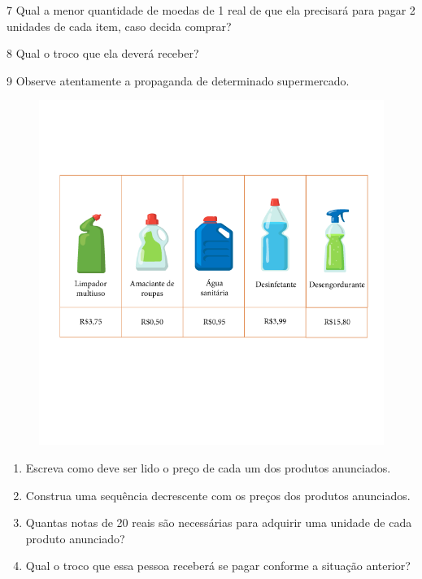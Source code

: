 \num{7} 
  Qual a menor quantidade de moedas de 1 real de que ela precisará para
  pagar 2 unidades de cada item, caso decida comprar?


\num{8} Qual o troco que ela deverá receber?



\num{9} Observe atentamente a propaganda de determinado supermercado.

\begin{figure}[htpb!]
\includegraphics[width=\textwidth]{../ilustracoes/MAT5/SAEB_5ANO_MAT_figura55.png}
\end{figure}

\begin{enumerate}
\item
  Escreva como deve ser lido o preço de cada um dos produtos anunciados.


\item
  Construa uma sequência decrescente com os preços dos produtos anunciados.


\item
  Quantas notas de 20 reais são necessárias para adquirir uma unidade de
  cada produto anunciado?


\item
  Qual o troco que essa pessoa receberá se pagar conforme a situação anterior?

\end{enumerate}

